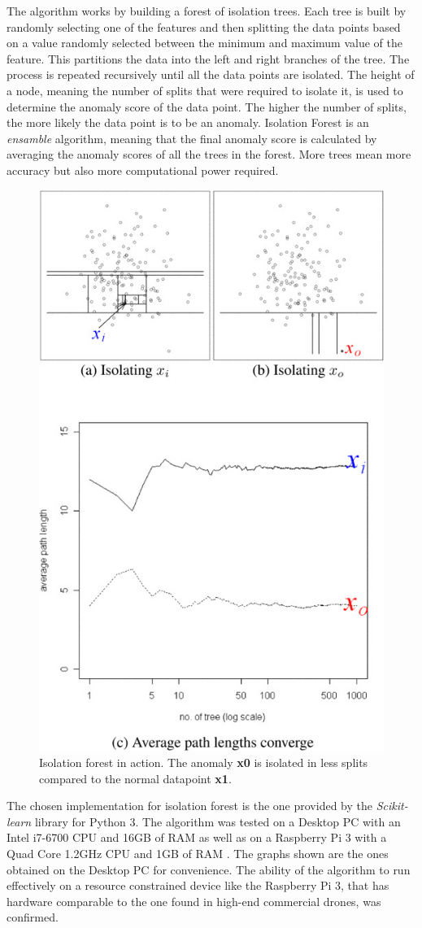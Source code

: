 \documentclass[futureinternet,article,submit,pdftex,moreauthors]{Definitions/mdpi}
\begin{document}
The algorithm works by building a forest of isolation trees. Each tree is built by randomly selecting one of the features and then splitting the data points based on a value randomly selected between the minimum and maximum value of the feature. This partitions the data into the 
left and right branches of the tree. The process is repeated recursively until all the data points are isolated. The height of a node, meaning the number of splits that were required to isolate it, is used to determine the anomaly score of the data point. The higher the number of splits, the more likely the data point is to be an anomaly.
Isolation Forest is an \textit{ensamble} algorithm, meaning that the final anomaly score is calculated by averaging the anomaly scores of all the trees in the forest. More trees mean more accuracy but also more computational power required.

\begin{figure}[H]
	\includegraphics[width=6 cm]{img/IsolationForest.jpg}
	\caption{Isolation forest in action. The anomaly \textbf{x0} is isolated in less splits compared to the normal datapoint \textbf{x1}\cite{IsolationForestLiu}.}
	\label{fig:IsolationForest}
\end{figure}   
\unskip

The chosen implementation for isolation forest is the one provided by the \textit{Scikit-learn} library \cite{IsolationForestScikitLearn} for Python 3. 
The algorithm was tested on a Desktop PC with an Intel i7-6700 CPU and 16GB of RAM as well as on a Raspberry Pi 3 with a Quad Core 1.2GHz CPU and 1GB of RAM \cite{RaspberryPi3ModelB}.
The graphs shown are the ones obtained on the Desktop PC for convenience. The ability of the algorithm to run effectively on a resource constrained device like the Raspberry Pi 3, that has hardware comparable to the one found in high-end commercial drones, was confirmed. 
\end{document}
